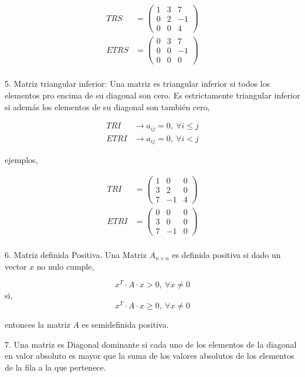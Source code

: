 \begin{align*}
TRS&=\begin{pmatrix}
1 & 3 & 7\\
0 & 2 & -1\\
0 & 0 & 4
\end{pmatrix}\\
ETRS&=\begin{pmatrix}
0 & 3 & 7\\
0 & 0 & -1\\
0 & 0 & 0
\end{pmatrix}\\
\end{align*}
\begin{paracol}{2}
5. Matriz triangular inferior: Una matriz es triangular inferior si todos los elementos pro encima de su diagonal son cero. Es estrictamente triangular inferior si además los elementos de su diagonal son también cero,
\end{paracol}
\begin{align*}
TRI& \rightarrow a_{ij} = 0, \ \forall i\leq j \\
ETRI& \rightarrow a_{ij} = 0, \ \forall i < j 
\end{align*}
\begin{paracol}{2}
ejemplos,
\end{paracol}

\begin{align*}
TRI&=\begin{pmatrix}
1 & 0 & 0\\
3 & 2 & 0\\
7 & -1 & 4
\end{pmatrix}\\
ETRI&=\begin{pmatrix}
0 & 0 & 0\\
3 & 0 & 0\\
7 & -1 & 0
\end{pmatrix}\\
\end{align*}
\begin{paracol}{2}
6. Matriz definida Positiva. Una Matriz $A_{n \times n}$ es definida positiva si dado un vector $x$ no nulo cumple,
\end{paracol}
\begin{equation*}
x^T\cdot A \cdot x > 0, \ \forall x\neq 0
\end{equation*}
si,
\begin{equation*}
x^T\cdot A \cdot x \geq 0, \ \forall x\neq 0
\end{equation*}
\begin{paracol}{2}
entonces la matriz $A$ es semidefinida positiva.

7. Una matriz es Diagonal dominante si cada uno de los elementos de la diagonal en valor absoluto es mayor que la suma de los valores absolutos de los elementos de la fila a la  que pertenece.
\end{paracol}

